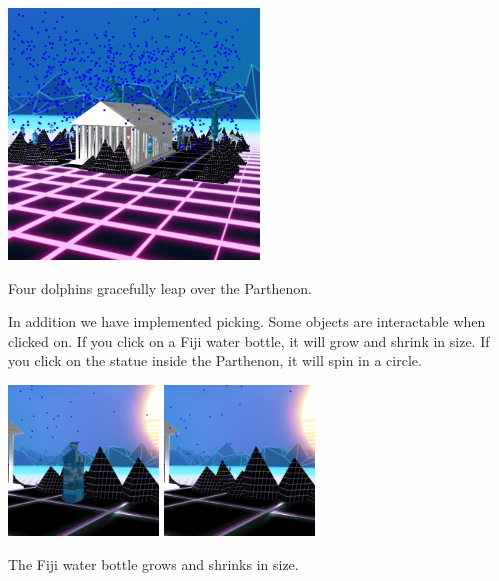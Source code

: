 \documentclass[10pt,letterpaper,oneside]{article}
\numberwithin{equation}{section}		%
\numberwithin{figure}{section}			%
\numberwithin{table}{section}				%
\begin{document}
\begin{center}
    \includegraphics[width=0.5\textwidth]{dolphins.png}
    
    Four dolphins gracefully leap over the Parthenon.
\end{center}


In addition we have implemented picking. Some objects are interactable when clicked on. If you click on a Fiji water bottle, it will grow and shrink in size. If you click on the statue inside the Parthenon, it will spin in a circle.

\begin{center}
    \includegraphics[width=0.3\textwidth]{large.png}
    \includegraphics[width=0.3\textwidth]{small.png}
    
    The Fiji water bottle grows and shrinks in size.
\end{center}
\end{document}
